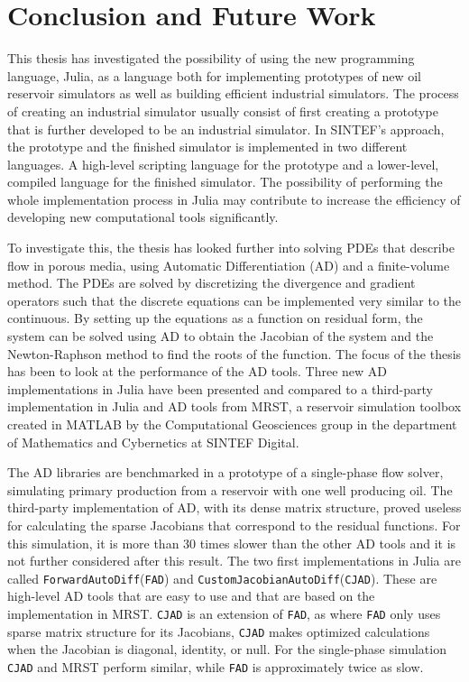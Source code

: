 \chapter{Conclusion and Future Work}
\label{ch:Conclusion}
This thesis has investigated the possibility of using the new programming language, Julia, as a language both for implementing prototypes of new oil reservoir simulators as well as building efficient industrial simulators. The process of creating an industrial simulator usually consist of first creating a prototype that is further developed to be an industrial simulator. In SINTEF's approach, the prototype and the finished simulator is implemented in two different languages. A high-level scripting language for the prototype and a lower-level, compiled language for the finished simulator. The possibility of performing the whole implementation process in Julia may contribute to increase the efficiency of developing new computational tools significantly.

To investigate this, the thesis has looked further into solving PDEs that describe flow in porous media, using Automatic Differentiation (AD) and a finite-volume method. The PDEs are solved by discretizing the divergence and gradient operators such that the discrete equations can be implemented very similar to the continuous. By setting up the equations as a function on residual form, the system can be solved using AD to obtain the Jacobian of the system and the Newton-Raphson method to find the roots of the function. The focus of the thesis has been to look at the performance of the AD tools. Three new AD implementations in Julia have been presented and compared to a third-party implementation in Julia and AD tools from MRST, a reservoir simulation toolbox created in MATLAB by the Computational Geosciences group in the department of Mathematics and Cybernetics at SINTEF Digital\emph{\citep{mrstHomepage}}. 

The AD libraries are benchmarked in a prototype of a single-phase flow solver, simulating primary production from a reservoir with one well producing oil. The third-party implementation of AD, with its dense matrix structure, proved useless for calculating the sparse Jacobians that correspond to the residual functions. For this simulation, it is more than 30 times slower than the other AD tools and it is not further considered after this result. The two first implementations in Julia are called \texttt{ForwardAutoDiff}(\texttt{FAD}) and \texttt{CustomJacobianAutoDiff}(\texttt{CJAD}). These are high-level AD tools that are easy to use and that are based on the implementation in MRST. \texttt{CJAD} is an extension of \texttt{FAD}, as where \texttt{FAD} only uses sparse matrix structure for its Jacobians, \texttt{CJAD} makes optimized calculations when the Jacobian is diagonal, identity, or null. For the single-phase simulation \texttt{CJAD} and MRST perform similar, while \texttt{FAD} is approximately twice as slow. 

